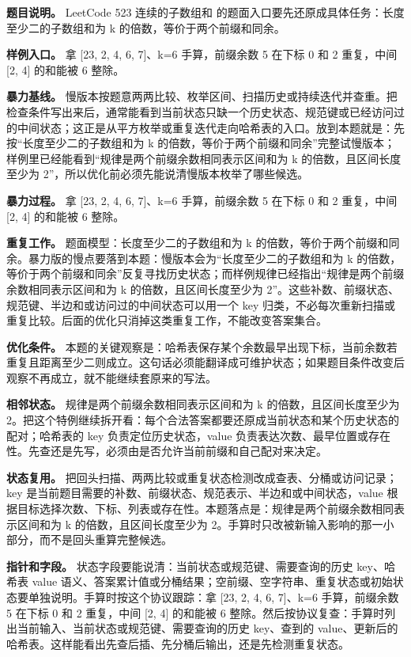 \textbf{题目说明。} LeetCode 523 连续的子数组和 的题面入口要先还原成具体任务：长度至少二的子数组和为 k 的倍数，等价于两个前缀和同余。

\textbf{样例入口。} 拿 [23, 2, 4, 6, 7]、k=6 手算，前缀余数 5 在下标 0 和 2 重复，中间 [2, 4] 的和能被 6 整除。

\textbf{暴力基线。} 慢版本按题意两两比较、枚举区间、扫描历史或持续迭代并查重。把检查条件写出来后，通常能看到当前状态只缺一个历史状态、规范键或已经访问过的中间状态；这正是从平方枚举或重复迭代走向哈希表的入口。放到本题就是：先按“长度至少二的子数组和为 k 的倍数，等价于两个前缀和同余”完整试慢版本；样例里已经能看到“规律是两个前缀余数相同表示区间和为 k 的倍数，且区间长度至少为 2”，所以优化前必须先能说清慢版本枚举了哪些候选。

\textbf{暴力过程。} 拿 [23, 2, 4, 6, 7]、k=6 手算，前缀余数 5 在下标 0 和 2 重复，中间 [2, 4] 的和能被 6 整除。

\textbf{重复工作。} 题面模型：长度至少二的子数组和为 k 的倍数，等价于两个前缀和同余。暴力版的慢点要落到本题：慢版本会为“长度至少二的子数组和为 k 的倍数，等价于两个前缀和同余”反复寻找历史状态；而样例规律已经指出“规律是两个前缀余数相同表示区间和为 k 的倍数，且区间长度至少为 2”。这些补数、前缀状态、规范键、半边和或访问过的中间状态可以用一个 key 归类，不必每次重新扫描或重复比较。后面的优化只消掉这类重复工作，不能改变答案集合。

\textbf{优化条件。} 本题的关键观察是：哈希表保存某个余数最早出现下标，当前余数若重复且距离至少二则成立。这句话必须能翻译成可维护状态；如果题目条件改变后观察不再成立，就不能继续套原来的写法。

\textbf{相邻状态。} 规律是两个前缀余数相同表示区间和为 k 的倍数，且区间长度至少为 2。把这个特例继续拆开看：每个合法答案都要还原成当前状态和某个历史状态的配对；哈希表的 key 负责定位历史状态，value 负责表达次数、最早位置或存在性。先查还是先写，必须由是否允许当前前缀和自己配对来决定。

\textbf{状态复用。} 把回头扫描、两两比较或重复状态检测改成查表、分桶或访问记录；key 是当前题目需要的补数、前缀状态、规范表示、半边和或中间状态，value 根据目标选择次数、下标、列表或存在性。本题落点是：规律是两个前缀余数相同表示区间和为 k 的倍数，且区间长度至少为 2。手算时只改被新输入影响的那一小部分，而不是回头重算完整候选。

\textbf{指针和字段。} 状态字段要能说清：当前状态或规范键、需要查询的历史 key、哈希表 value 语义、答案累计值或分桶结果；空前缀、空字符串、重复状态或初始状态要单独说明。手算时按这个协议跟踪：拿 [23, 2, 4, 6, 7]、k=6 手算，前缀余数 5 在下标 0 和 2 重复，中间 [2, 4] 的和能被 6 整除。然后按协议复查：手算时列出当前输入、当前状态或规范键、需要查询的历史 key、查到的 value、更新后的哈希表。这样能看出先查后插、先分桶后输出，还是先检测重复状态。


